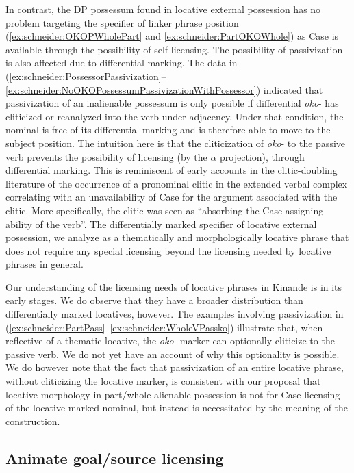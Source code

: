 \documentclass[output=paper]{langscibook}
\begin{document}
In contrast, the DP possessum found in locative external possession has no problem targeting the specifier of linker phrase position (\ref{ex:schneider:OKOPWholePart} and  \ref{ex:schneider:PartOKOWhole}) as Case is available through the possibility of self-licensing. The possibility of passivization is also affected due to differential marking. The data in (\ref{ex:schneider:PossessorPassivization}--\ref{ex:schneider:NoOKOPossessumPassivizationWithPossessor}) indicated that passivization of an inalienable possessum is only possible if differential \textit{oko}- has cliticized or reanalyzed into the verb under adjacency. Under that condition, the nominal is free of its differential marking and is therefore able to move to the subject position. The intuition here is that the cliticization of \textit{oko}- to the passive verb prevents the possibility of licensing (by the $\alpha$ projection), through differential marking. This is reminiscent of early accounts in the clitic-doubling literature of the occurrence of a pronominal clitic in the extended verbal complex correlating with an unavailability of Case for the argument associated with the clitic. More specifically, the clitic was seen as “absorbing the Case assigning ability of the verb”. 
The differentially marked specifier of locative external possession, we analyze as a thematically and morphologically locative phrase that does not require any special licensing beyond the licensing needed by locative phrases in general.

Our understanding of the licensing needs of locative phrases in Kinande is in its early stages. We do observe that they have a broader distribution than differentially marked locatives, however. The examples involving passivization in (\ref{ex:schneider:PartPass}--\ref{ex:schneider:WholeVPassko}) illustrate that, when reflective of a thematic locative, the \textit{oko}- marker can optionally cliticize to the passive verb. We do not yet have an account of why this optionality is possible. We do however note that the fact that passivization of an entire locative phrase, without cliticizing the locative marker, is consistent with our proposal that locative morphology in part/whole-alienable possession is not for Case licensing of the locative marked nominal, but instead is necessitated by the meaning of the construction. 

\subsection{Animate goal/source licensing}\label{sec:schneider:subsection5.3AnimateGoalSourceLicensing}
\end{document}
